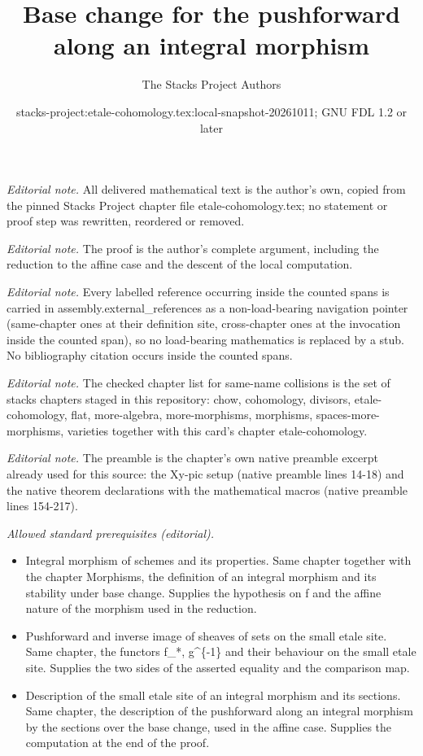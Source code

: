 \documentclass[10pt,a4paper]{amsart}
\title{Base change for the pushforward along an integral morphism}
\author{The Stacks Project Authors}
\date{stacks-project:etale-cohomology.tex:local-snapshot-20261011; GNU FDL 1.2 or later}
\theoremstyle{plain}
\theoremstyle{definition}
\theoremstyle{remark}
\numberwithin{equation}{subsection}
\begin{document}
\maketitle
\noindent\textit{Editorial note.} All delivered mathematical text is the author's own, copied from the pinned Stacks Project chapter file etale-cohomology.tex; no statement or proof step was rewritten, reordered or removed.\par\medskip
\noindent\textit{Editorial note.} The proof is the author's complete argument, including the reduction to the affine case and the descent of the local computation.\par\medskip
\noindent\textit{Editorial note.} Every labelled reference occurring inside the counted spans is carried in assembly.external\_references as a non-load-bearing navigation pointer (same-chapter ones at their definition site, cross-chapter ones at the invocation inside the counted span), so no load-bearing mathematics is replaced by a stub. No bibliography citation occurs inside the counted spans.\par\medskip
\noindent\textit{Editorial note.} The checked chapter list for same-name collisions is the set of stacks chapters staged in this repository: chow, cohomology, divisors, etale-cohomology, flat, more-algebra, more-morphisms, morphisms, spaces-more-morphisms, varieties together with this card's chapter etale-cohomology.\par\medskip
\noindent\textit{Editorial note.} The preamble is the chapter's own native preamble excerpt already used for this source: the Xy-pic setup (native preamble lines 14-18) and the native theorem declarations with the mathematical macros (native preamble lines 154-217).\par\medskip
\noindent\textit{Allowed standard prerequisites (editorial).}\begin{itemize}
\item Integral morphism of schemes and its properties. Same chapter together with the chapter Morphisms, the definition of an integral morphism and its stability under base change. Supplies the hypothesis on f and the affine nature of the morphism used in the reduction.
\item Pushforward and inverse image of sheaves of sets on the small etale site. Same chapter, the functors f\_*, g\textasciicircum{}\{-1\} and their behaviour on the small etale site. Supplies the two sides of the asserted equality and the comparison map.
\item Description of the small etale site of an integral morphism and its sections. Same chapter, the description of the pushforward along an integral morphism by the sections over the base change, used in the affine case. Supplies the computation at the end of the proof.
\end{itemize}\medskip
\end{document}
